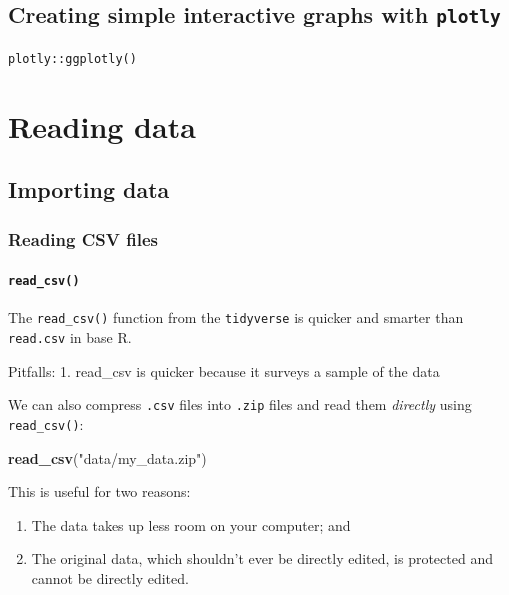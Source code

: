 \documentclass[]{book}
\newenvironment{Shaded}{\begin{snugshade}}{\end{snugshade}}
\newcommand{\KeywordTok}[1]{\textcolor[rgb]{0.13,0.29,0.53}{\textbf{#1}}}
\newcommand{\NormalTok}[1]{#1}
\newcommand{\StringTok}[1]{\textcolor[rgb]{0.31,0.60,0.02}{#1}}
\providecommand{\tightlist}{%
  \setlength{\itemsep}{0pt}\setlength{\parskip}{0pt}}
\begin{document}
\hypertarget{creating-simple-interactive-graphs-with-plotly}{%
\section{\texorpdfstring{Creating simple interactive graphs with \texttt{plotly}}{Creating simple interactive graphs with plotly}}\label{creating-simple-interactive-graphs-with-plotly}}

\texttt{plotly::ggplotly()}

\hypertarget{reading-data}{%
\chapter{Reading data}\label{reading-data}}

\hypertarget{importing-data}{%
\section{Importing data}\label{importing-data}}

\hypertarget{reading-csv-files}{%
\subsection{Reading CSV files}\label{reading-csv-files}}

\hypertarget{read_csv}{%
\subsubsection{\texorpdfstring{\texttt{read\_csv()}}{read\_csv()}}\label{read_csv}}

The \texttt{read\_csv()} function from the \texttt{tidyverse} is quicker and smarter than \texttt{read.csv} in base R.

Pitfalls:
1. read\_csv is quicker because it surveys a sample of the data

We can also compress \texttt{.csv} files into \texttt{.zip} files and read them \emph{directly} using \texttt{read\_csv()}:

\begin{Shaded}
\begin{Highlighting}[]
\KeywordTok{read_csv}\NormalTok{(}\StringTok{"data/my_data.zip"}\NormalTok{)}
\end{Highlighting}
\end{Shaded}

This is useful for two reasons:

\begin{enumerate}
\def\labelenumi{\arabic{enumi}.}
\tightlist
\item
  The data takes up less room on your computer; and
\item
  The original data, which shouldn't ever be directly edited, is protected and cannot be directly edited.
\end{enumerate}
\end{document}
